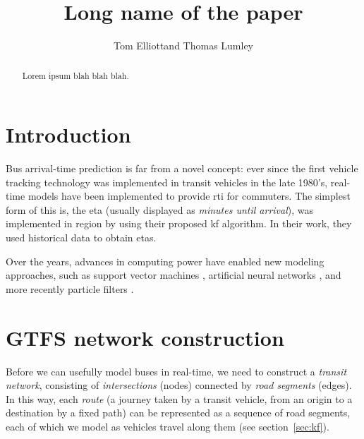 \documentclass[times, doublespace]{anzsauth}
\begin{document}
\cleanlookdateon
{}
\title{Long name of the paper}
\author{Tom Elliott\corrauth and Thomas Lumley}
\address{
    Department of Statistics, University of Auckland, Private Bag 92019, Auckland 1142, New Zealand\\
    Email: \texttt{tom.elliott@auckland.ac.nz}
}

\begin{abstract}
Lorem ipsum blah blah blah.
\end{abstract}


\maketitle
\section{Introduction}
\label{sec:intro}

Bus arrival-time prediction is far from a novel concept: 
ever since the first vehicle tracking technology was implemented
in transit vehicles in the late 1980's, 
real-time models have been implemented to provide \gls{rti} for commuters.
The simplest form of this is, the \gls{eta}
(usually displayed as \emph{minutes until arrival}),
was implemented in {{region}} by \cite{Wall99analgorithm} 
using their proposed \gls{kf} algorithm.
In their work, they used historical data to obtain \glspl{eta}.

Over the years, advances in computing power have enabled new
modeling approaches,
such as support vector machines \citep{Yu_2006},
artificial neural networks \citep{Yu_2011},
and more recently particle filters \citep{Hans_2015}.



\section{GTFS network construction}
\label{sec:gtfs}

Before we can usefully model buses in real-tim{}e, 
we need to construct a \emph{transit network},
consisting of \emph{intersections} (nodes)
connected by \emph{road segments} (edges).
In this way, each \emph{route} 
(a journey taken by a transit vehicle, from an origin to a destination by a fixed path)
can be represented as a sequence of road segments,
each of which we model as vehicles travel along them (see section~\ref{sec:kf}).
\end{document}
